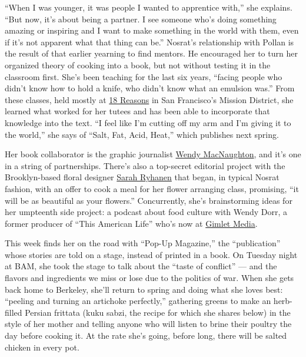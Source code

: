 ``When I was younger, it was people I wanted to apprentice with,'' she
explains. ``But now, it's about being a partner. I see someone who's
doing something amazing or inspiring and I want to make something in the
world with them, even if it's not apparent what that thing can be.''
Nosrat's relationship with Pollan is the result of that earlier yearning
to find mentors. He encouraged her to turn her organized theory of
cooking into a book, but not without testing it in the classroom first.
She's been teaching for the last six years, ``facing people who didn't
know how to hold a knife, who didn't know what an emulsion was.'' From
these classes, held mostly at \href{https://18reasons.org/}{18 Reasons}
in San Francisco's Mission District, she learned what worked for her
tutees and has been able to incorporate that knowledge into the text.
``I feel like I'm cutting off my arm and I'm giving it to the world,''
she says of ``Salt, Fat, Acid, Heat,'' which publishes next spring.

Her book collaborator is the graphic journalist
\href{http://tmagazine.blogs.nytimes3xbfgragh.onion/2014/03/17/bookshelf-an-illustrator-captures-the-spirit-of-san-francisco-and-an-april-bloomfield-recipe/}{Wendy
MacNaughton}, and it's one in a string of partnerships. There's also a
top-secret editorial project with the Brooklyn-based floral designer
\href{http://tmagazine.blogs.nytimes3xbfgragh.onion/2015/07/13/sarah-ryhanen-saipua-worlds-end/}{Sarah
Ryhanen} that began, in typical Nosrat fashion, with an offer to cook a
meal for her flower arranging class, promising, ``it will be as
beautiful as your flowers.'' Concurrently, she's brainstorming ideas for
her umpteenth side project: a podcast about food culture with Wendy
Dorr, a former producer of ``This American Life'' who's now at
\href{https://gimletmedia.com}{Gimlet Media}.

This week finds her on the road with ``Pop-Up Magazine,'' the
``publication'' whose stories are told on a stage, instead of printed in
a book. On Tuesday night at BAM, she took the stage to talk about the
``taste of conflict'' --- and the flavors and ingredients we miss or
lose due to the politics of war. When she gets back home to Berkeley,
she'll return to spring and doing what she loves best: ``peeling and
turning an artichoke perfectly,'' gathering greens to make an
herb-filled Persian frittata (kuku sabzi, the recipe for which she
shares below) in the style of her mother and telling anyone who will
listen to brine their poultry the day before cooking it. At the rate
she's going, before long, there will be salted chicken in every pot.

